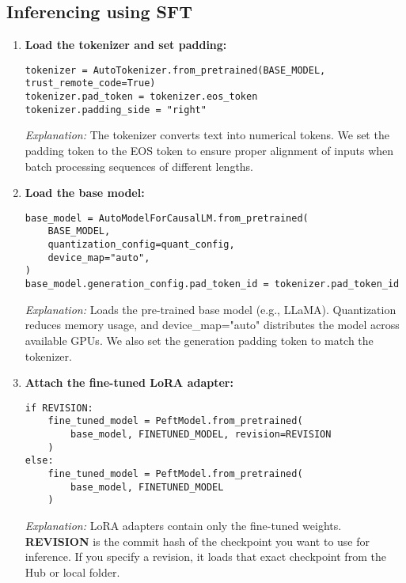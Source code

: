 \documentclass[a4paper, 12pt]{article}
\begin{document}
\subsection*{Inferencing using SFT}
\begin{tcolorbox}[colback=green!5!white, colframe=green!80!black, title=\textbf{Running Inference with Fine-tuned Model}, 
                  coltitle=black, fonttitle=\bfseries, enhanced, sharp corners, boxrule=1pt]
\begin{enumerate}
    \item \textbf{Load the tokenizer and set padding:}
    \begin{verbatim}
tokenizer = AutoTokenizer.from_pretrained(BASE_MODEL, trust_remote_code=True)
tokenizer.pad_token = tokenizer.eos_token
tokenizer.padding_side = "right"
    \end{verbatim}
    \textit{Explanation:} The tokenizer converts text into numerical tokens. 
    We set the padding token to the EOS token to ensure proper alignment of inputs 
    when batch processing sequences of different lengths.  

    \item \textbf{Load the base model:}
    \begin{verbatim}
base_model = AutoModelForCausalLM.from_pretrained(
    BASE_MODEL,
    quantization_config=quant_config,
    device_map="auto",
)
base_model.generation_config.pad_token_id = tokenizer.pad_token_id
    \end{verbatim}
    \textit{Explanation:} Loads the pre-trained base model (e.g., LLaMA). 
    Quantization reduces memory usage, and device\_map="auto" distributes 
    the model across available GPUs. We also set the generation padding token 
    to match the tokenizer.  

    \item \textbf{Attach the fine-tuned LoRA adapter:}
    \begin{verbatim}
if REVISION:
    fine_tuned_model = PeftModel.from_pretrained(
        base_model, FINETUNED_MODEL, revision=REVISION
    )
else:
    fine_tuned_model = PeftModel.from_pretrained(
        base_model, FINETUNED_MODEL
    )
    \end{verbatim}
    \textit{Explanation:} LoRA adapters contain only the fine-tuned weights.  
    \textbf{REVISION} is the commit hash of the checkpoint you want to use for inference.  
    If you specify a revision, it loads that exact checkpoint from the Hub or local folder.  
\end{enumerate}
\end{tcolorbox}
\end{document}

